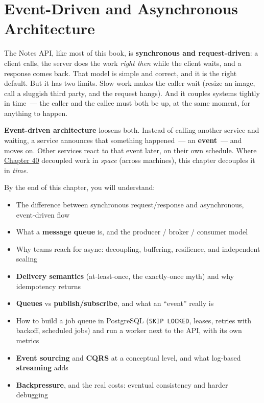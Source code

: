 \setcounter{chapter}{40}
\chapter{Event-Driven and Asynchronous Architecture}\label{ch:41-event-driven-architecture}

\chapterrule

The Notes API, like most of this book, is \textbf{synchronous and request-driven}: a client calls, the server does the work \emph{right then} while the client waits, and a response comes back. That model is simple and correct, and it is the right default. But it has two limits. Slow work makes the caller wait (resize an image, call a sluggish third party, and the request hangs). And it couples systems tightly in time~--- the caller and the callee must both be up, at the same moment, for anything to happen.

\textbf{Event-driven architecture} loosens both. Instead of calling another service and waiting, a service announces that something happened~--- an \textbf{event}~--- and moves on. Other services react to that event later, on their own schedule. Where \hyperref[ch:40-distributed-systems]{Chapter 40} decoupled work in \emph{space} (across machines), this chapter decouples it in \emph{time}.

\begin{objectives}

By the end of this chapter, you will understand:

\begin{itemize}
\tightlist
\item
  The difference between synchronous request/response and asynchronous, event-driven flow
\item
  What a \textbf{message queue} is, and the producer / broker / consumer model
\item
  Why teams reach for async: decoupling, buffering, resilience, and independent scaling
\item
  \textbf{Delivery semantics} (at-least-once, the exactly-once myth) and why idempotency returns
\item
  \textbf{Queues} vs \textbf{publish/subscribe}, and what an ``event'' really is
\item
  How to build a job queue in PostgreSQL (\texttt{SKIP\ LOCKED}, leases, retries with backoff, scheduled jobs) and run a worker next to the API, with its own metrics
\item
  \textbf{Event sourcing} and \textbf{CQRS} at a conceptual level, and what log-based \textbf{streaming} adds
\item
  \textbf{Backpressure}, and the real costs: eventual consistency and harder debugging
\end{itemize}

\end{objectives}

